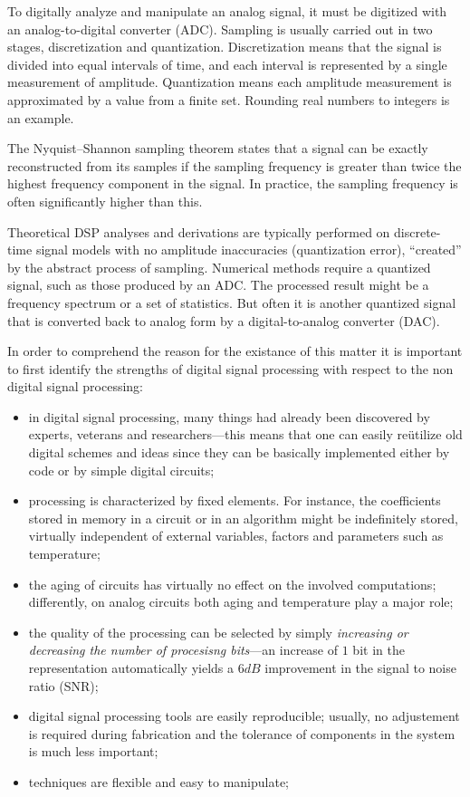 \documentclass[\documentfontsize, twocolumn]{\classname}
\begin{document}
To digitally analyze and manipulate an analog signal, it must be digitized with an analog-to-digital converter (ADC).
Sampling is usually carried out in two stages, discretization and quantization.
Discretization means that the signal is divided into equal intervals of time, and each interval is represented by a single measurement of amplitude.
Quantization means each amplitude measurement is approximated by a value from a finite set.
Rounding real numbers to integers is an example.

The Nyquist–Shannon sampling theorem states that a signal can be exactly reconstructed from its samples if the sampling frequency is greater than twice the highest frequency component in the signal.
In practice, the sampling frequency is often significantly higher than this.

Theoretical DSP analyses and derivations are typically performed on discrete-time signal models with no amplitude inaccuracies (quantization error), ``created'' by the abstract process of sampling.
Numerical methods require a quantized signal, such as those produced by an ADC.
The processed result might be a frequency spectrum or a set of statistics.
But often it is another quantized signal that is converted back to analog form by a digital-to-analog converter (DAC)\cite{bib:wikiDSP}.

In order to comprehend the reason for the existance of this matter it is important to first identify the strengths of digital signal processing with respect to the non digital signal processing:
\begin{itemize}
    \item in digital signal processing, many things had already been discovered by experts, veterans and researchers---this means that one can easily re\"utilize old digital schemes and ideas since they can be basically implemented either by code or by simple digital circuits;
    \item processing is characterized by fixed elements. For instance, the coefficients stored in memory in a circuit or in an algorithm might be indefinitely stored, virtually independent of external variables, factors and parameters such as temperature;
    \item the aging of circuits has virtually no effect on the involved computations; differently, on analog circuits both aging and temperature play a major role;
    \item the quality of the processing can be selected by simply \emph{increasing or decreasing the number of procesisng bits}---an increase of $1$ bit in the representation automatically yields a $6 dB$ improvement in the signal to noise ratio (SNR);
    \item digital signal processing tools are easily reproducible; usually, no adjustement is required during fabrication and the tolerance of components in the system is much less important;
    \item techniques are flexible and easy to manipulate;
\end{itemize}
\end{document}
